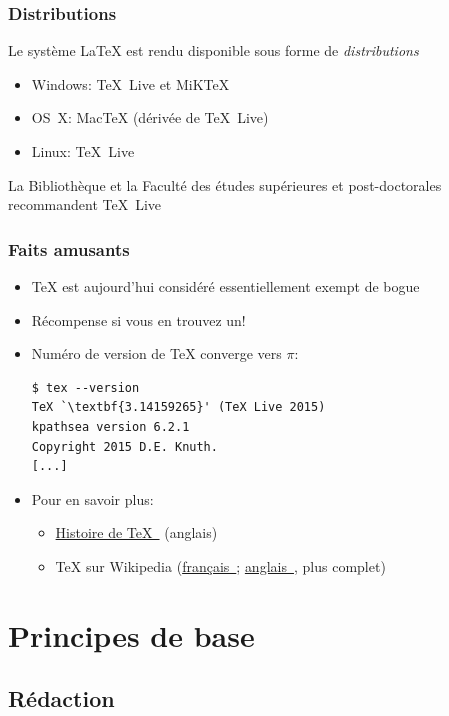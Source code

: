 \documentclass[aspectratio=54,10pt,xcolor=x11names]{beamer}
\newcommand{\link}[2]{\href{#1}{#2~\raisebox{-0.2ex}{\faExternalLink}}}
\theoremstyle{example}
\begin{document}
\begin{frame}
  \frametitle{Distributions}

  Le système {\LaTeX} est rendu disponible sous forme de \emph{distributions}

  \begin{itemize}
  \item Windows: {\TeX}~Live et MiK{\TeX}
  \item OS~X: Mac{\TeX} (dérivée de {\TeX}~Live)
  \item Linux: {\TeX}~Live
  \end{itemize}
  La Bibliothèque et la Faculté des études supérieures et
  post-doctorales recommandent {\TeX}~Live
\end{frame}

\begin{frame}[fragile=singleslide]
  \frametitle{Faits amusants}
  \begin{itemize}
  \item {\TeX} est aujourd'hui considéré essentiellement exempt de bogue
  \item Récompense si vous en trouvez un!
  \item Numéro de version de {\TeX} converge vers $\pi$:
\begin{lstlisting}
$ tex --version
TeX `\textbf{3.14159265}' (TeX Live 2015)
kpathsea version 6.2.1
Copyright 2015 D.E. Knuth.
[...]
\end{lstlisting}
  \item Pour en savoir plus:
    \begin{itemize}
    \item \link{http://www.tug.org/whatis.html}{Histoire de \TeX} (anglais)
    \item {\TeX} sur Wikipedia
      (\link{http://fr.wikipedia.org/wiki/TeX}{français};
      \link{http://en.wikipedia.org/wiki/TeX}{anglais}, plus complet)
    \end{itemize}
  \end{itemize}
\end{frame}


\section{Principes de base}

\subsection{Rédaction}
\end{document}
